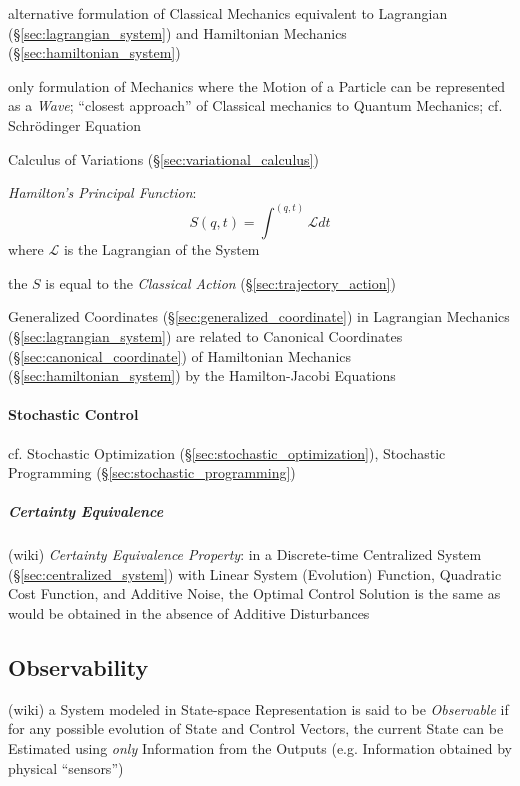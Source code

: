 alternative formulation of Classical Mechanics equivalent to Lagrangian
(\S\ref{sec:lagrangian_system}) and Hamiltonian Mechanics
(\S\ref{sec:hamiltonian_system})

only formulation of Mechanics where the Motion of a Particle can be represented
as a \emph{Wave}; ``closest approach'' of Classical mechanics to Quantum
Mechanics; cf. Schr\"odinger Equation

\fist Calculus of Variations (\S\ref{sec:variational_calculus})

\emph{Hamilton's Principal Function}:
\[
  S(q,t) = \int^{(q,t)} \mathcal{L} dt
\]
where $\mathcal{L}$ is the Lagrangian of the System

the $S$ is equal to the \emph{Classical Action} (\S\ref{sec:trajectory_action})

Generalized Coordinates (\S\ref{sec:generalized_coordinate}) in Lagrangian
Mechanics (\S\ref{sec:lagrangian_system}) are related to Canonical Coordinates
(\S\ref{sec:canonical_coordinate}) of Hamiltonian Mechanics
(\S\ref{sec:hamiltonian_system}) by the Hamilton-Jacobi Equations



\paragraph{Stochastic Control}\label{sec:stochastic_control}\hfill

cf. Stochastic Optimization (\S\ref{sec:stochastic_optimization}),
Stochastic Programming (\S\ref{sec:stochastic_programming})



\subparagraph{Certainty Equivalence}\label{sec:certainty_equivalence}\hfill

(wiki)
\emph{Certainty Equivalence Property}: in a Discrete-time Centralized
System (\S\ref{sec:centralized_system}) with Linear System (Evolution) Function,
Quadratic Cost Function, and Additive Noise, the Optimal Control Solution is the
same as would be obtained in the absence of Additive Disturbances



\subsection{Observability}\label{sec:observability}

(wiki) a System modeled in State-space Representation is said to be
\emph{Observable} if for any possible evolution of State and Control Vectors,
the current State can be Estimated using \emph{only} Information from the
Outputs (e.g. Information obtained by physical ``sensors'')

